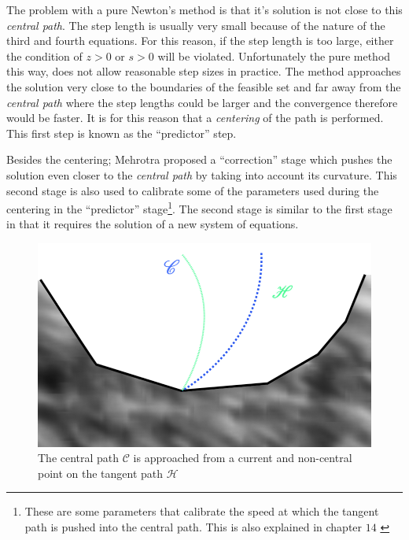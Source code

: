 The problem with a pure Newton's method is that it's solution is not close to this \emph{central path}. The step length is usually very small because of the nature of the third and fourth equations. For this reason, if the step length is too large, either the condition of $z > 0$ or $s > 0$ will be violated. Unfortunately the pure method this way, does not allow reasonable step sizes in practice. The method approaches the solution very close to the boundaries of the feasible set and far away from the \emph{central path} where the step lengths could be larger and the convergence therefore would be faster. It is for this reason that a \emph{centering} of the path is performed. This first step is known as the ``predictor'' step.

Besides the centering; Mehrotra proposed a ``correction'' stage which pushes the solution even closer to the \emph{central path} by taking into account its curvature. This second stage is also used to calibrate some of the parameters used during the centering in the ``predictor'' stage\footnote{These are some parameters that calibrate the speed at which the tangent path is pushed into the central path. This is also explained in chapter $14$ \citep{nocedal}}. The second stage is similar to the first stage in that it requires the solution of a new system of equations.

\begin{figure}
\begin{center}
\includegraphics[scale=0.3]{Figures/CentralPath.png}
\caption[The Central Path and the Tangent Path]{The central path $\mathcal{C}$ is approached from a current and non-central point on the tangent path $\mathcal{H}$}
\end{center}
\end{figure}

